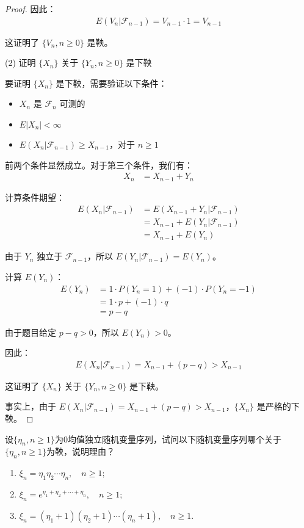 \documentclass[lang=cn,10pt,thmcnt=section]{elegantbook}
\begin{document}
\begin{proof}
因此：
\begin{align}
E(V_n|\mathcal{F}_{n-1}) = V_{n-1} \cdot 1 = V_{n-1}
\end{align}

这证明了 $\{V_n, n \geq 0\}$ 是鞅。

(2) 证明 $\{X_n\}$ 关于 $\{Y_n, n \geq 0\}$ 是下鞅

要证明 $\{X_n\}$ 是下鞅，需要验证以下条件：
\begin{itemize}
    \item $X_n$ 是 $\mathcal{F}_n$ 可测的
    \item $E|X_n| < \infty$
    \item $E(X_n|\mathcal{F}_{n-1}) \geq X_{n-1}$，对于 $n \geq 1$
\end{itemize}

前两个条件显然成立。对于第三个条件，我们有：
\begin{align}
X_n &= X_{n-1} + Y_n
\end{align}

计算条件期望：
\begin{align}
E(X_n|\mathcal{F}_{n-1}) &= E(X_{n-1} + Y_n|\mathcal{F}_{n-1}) \\
&= X_{n-1} + E(Y_n|\mathcal{F}_{n-1}) \\
&= X_{n-1} + E(Y_n)
\end{align}

由于 $Y_n$ 独立于 $\mathcal{F}_{n-1}$，所以 $E(Y_n|\mathcal{F}_{n-1}) = E(Y_n)$。

计算 $E(Y_n)$：
\begin{align}
E(Y_n) &= 1 \cdot P(Y_n = 1) + (-1) \cdot P(Y_n = -1) \\
&= 1 \cdot p + (-1) \cdot q \\
&= p - q
\end{align}

由于题目给定 $p - q > 0$，所以 $E(Y_n) > 0$。

因此：
\begin{align}
E(X_n|\mathcal{F}_{n-1}) = X_{n-1} + (p - q) > X_{n-1}
\end{align}

这证明了 $\{X_n\}$ 关于 $\{Y_n, n \geq 0\}$ 是下鞅。

事实上，由于 $E(X_n|\mathcal{F}_{n-1}) = X_{n-1} + (p - q) > X_{n-1}$，$\{X_n\}$ 是严格的下鞅。

\end{proof}
\begin{example}
	设$\{\eta_n, n \geq 1\}$为0均值独立随机变量序列，试问以下随机变量序列哪个关于$\{\eta_n, n \geq 1\}$为鞅，说明理由？
    \begin{enumerate}
        \item $\xi_n = \eta_1 \eta_2 \cdots \eta_n, \quad n \geq 1;$
        \item $\xi_n = e^{\eta_1 + \eta_2 + \cdots + \eta_n}, \quad n \geq 1;$
        \item $\xi_n = (\eta_1 + 1)(\eta_2 + 1) \cdots (\eta_n + 1), \quad n \geq 1.$
    \end{enumerate}
\end{example}
\end{document}

